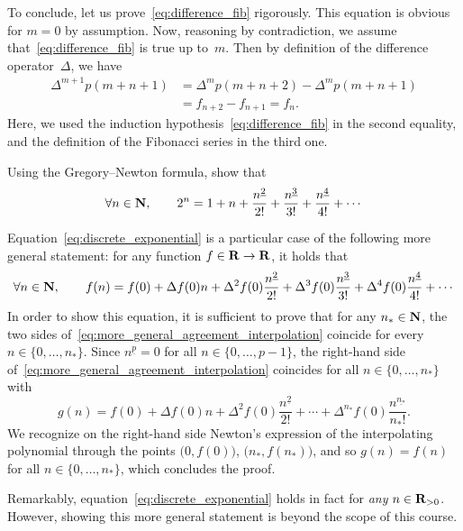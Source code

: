 \begin{solution}
    To conclude, let us prove~\eqref{eq:difference_fib} rigorously.
    This equation is obvious for $m = 0$ by assumption.
    Now, reasoning by contradiction, we assume that~\eqref{eq:difference_fib} is true up to~$m$.
    Then by definition of the difference operator~$\Delta$,
    we have
    \begin{align*}
        \Delta^{m+1} p(m+n+1)
        &= \Delta^m p(m+n+2) - \Delta^m p(m+n+1) \\
        &= f_{n+2} - f_{n+1} = f_n.
    \end{align*}
    Here, we used the induction hypothesis~\eqref{eq:difference_fib} in the second equality,
    and the definition of the Fibonacci series in the third one.
\end{solution}

\begin{exercise}
    Using the Gregory--Newton formula,
    show that
    \begin{equation}
        \label{eq:discrete_exponential}
        \forall n \in \mathbf N,
        \qquad 2^n = 1 + n + \frac{n^{\underline{2}}}{2!} + \frac{n^{\underline 3}}{3!} + \frac{n^{\underline 4}}{4!} + \dotsb
    \end{equation}
    \begin{solution}
        Equation~\eqref{eq:discrete_exponential} is a particular case of the following more general statement:
        for any function $f \in \mathbf R \to \mathbf R$, 
        it holds that
        \begin{equation}
            \label{eq:more_general_agreement_interpolation}
            \forall n \in \mathbf N,
            \qquad f(n) = f(0) + \Delta f(0) n + \Delta^2 f(0) \frac{n^{\underline{2}}}{2!} + \Delta^3 f(0) \frac{n^{\underline 3}}{3!} + \Delta^4 f(0) \frac{n^{\underline 4}}{4!} + \dotsb
        \end{equation}
        In order to show this equation,
        it is sufficient to prove that for any $n_* \in \mathbf N$,
        the two sides of~\eqref{eq:more_general_agreement_interpolation} coincide for every $n \in \{0, \dotsc, n_*\}$.
        Since $n^{\underline p} = 0$ for all $n \in \{0, \dotsc, p-1\}$,
        the right-hand side of~\eqref{eq:more_general_agreement_interpolation} coincides for all $n \in \{0, \dotsc, n_*\}$ with
        \[
            g(n) = f(0) + \Delta f(0) n + \Delta^2 f(0) \frac{n^{\underline{2}}}{2!} + \dotsb + \Delta^{n_*} f(0) \frac{n^{\underline {n_*}}}{{n_*}!}.
        \]
        We recognize on the right-hand side Newton's expression of the interpolating polynomial through the points $\bigl(0, f(0)\bigr)$, \dotsc $\bigl(n_*, f(n_*)\bigr)$,
        and so $g(n) = f(n)$ for all $n \in \{0, \dotsc, n_*\}$, 
        which concludes the proof.
    \end{solution}
    \begin{remark}
        Remarkably, equation~\eqref{eq:discrete_exponential} holds in fact for \emph{any} $n \in \mathbf R_{> 0}$.
        However, showing this more general statement is beyond the scope of this course.
    \end{remark}
\end{exercise}

